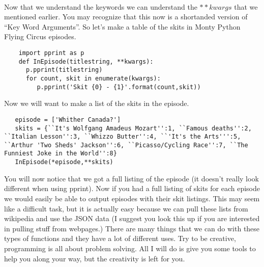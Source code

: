 \documentclass[11pt]{article}   %
\begin{document}
 \\
 Now that we understand the keywords we can understand the $**kwargs$ that we mentioned earlier.  You may recognize that this now is a shortanded version of ``Key Word Arguments''.  So let's make a table of the skits in Monty Python
 Flying Circus episodes.  
 \begin{tcolorbox}
    \begin{lstlisting}
    import pprint as p
    def InEpisode(titlestring, **kwargs):
      p.pprint(titlestring)
      for count, skit in enumerate(kwargs):
         p.pprint('Skit {0} - {1}'.format(count,skit))
   \end{lstlisting}
\end{tcolorbox}
Now we will want to make a list of the skits in the episode.
\begin{tcolorbox}
   \begin{lstlisting}
   episode = ['Whither Canada?']
   skits = {``It's Wolfgang Amadeus Mozart'':1, ``Famous deaths'':2, ``Italian Lesson'':3, ``Whizzo Butter'':4, ``'It's the Arts''':5, ``Arthur 'Two Sheds' Jackson'':6, ``Picasso/Cycling Race'':7, ``The Funniest Joke in the World'':8}
   InEpisode(*episode,**skits)
   \end{lstlisting}
\end{tcolorbox}

You will now notice that we got a full listing of the episode (it doesn't really look different when using pprint).  Now if you had a full listing of skits for each episode we would easily be able to output episodes with their skit
listings.  This may seem like a difficult task, but it is actually easy because we can pull these lists from wikipedia and use the JSON data (I suggest you look this up if you are interested in pulling stuff from webpages.)  There are
many things that we can do with these types of functions and they have a lot of different uses.  Try to be creative, programming is all about problem solving.  All I will do is give you some tools to help you along your way, but the
creativity is left for you.
\end{document}
